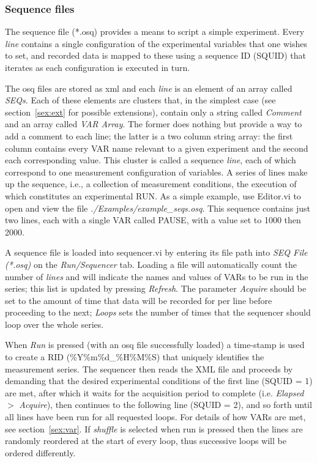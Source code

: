 \documentclass[10pt,a4paper]{article}
\begin{document}
\subsubsection{Sequence files}
The sequence file (*.osq) provides a means to script a simple experiment. Every \emph{line} contains a single configuration of the experimental variables that one wishes to set, and recorded data is mapped to these using a sequence ID (SQUID) that iterates as each configuration is executed in turn.

The osq files are stored as xml and each \emph{line} is an element of an array called \emph{SEQs}.  Each of these elements are clusters that, in the simplest case (see section~\ref{sex:ext} for possible extensions), contain only a string called \emph{Comment} and an array called \emph{VAR Array}. The former does nothing but provide a way to add a comment to each line; the latter is a two column string array: the first column contains every VAR name relevant to a given experiment and the second each corresponding value.  This cluster is called  a sequence \emph{line}, each of which correspond to one measurement configuration of variables.  A series of lines make up the sequence, i.e., a collection of measurement conditions, the execution of which constitutes an experimental RUN.  As a simple example, use Editor.vi to open and view the file \emph{./Examples/example\_seqs.osq}.  This sequence contains just two lines, each with a single VAR called PAUSE, with a value set to 1000 then 2000.

A sequence file is loaded into sequencer.vi by entering its file path into  \emph{SEQ File (*.osq)} on the \emph{Run/Sequencer} tab.  Loading a file will automatically count the number of \emph{lines} and will indicate the names and values of VARs to be run in the series; this list is updated by pressing \emph{Refresh}.  The parameter \emph{Acquire} should be set to the amount of time that data will be recorded for per line before proceeding to the next; \emph{Loops} sets the number of times that the sequencer should loop over the whole series. 

When \emph{Run} is pressed (with an osq file successfully loaded) a time-stamp is used to create a RID (\%Y\%m\%d\_\%H\%M\%S) that uniquely identifies the measurement series. The sequencer then reads the XML file and proceeds by demanding that the desired experimental conditions of the first line (SQUID = 1) are met, after which it waits for the acquisition period to complete (i.e. \emph{Elapsed} $>$ \emph{Acquire}), then continues to the following line (SQUID = 2), and so forth until all lines have been run for all requested loops.  For details of how VARs are met, see section~\ref{sex:var}.  If \emph{shuffle} is selected when run is pressed then the lines are randomly reordered at the start of every loop, thus successive loops will be ordered differently.
\end{document}
